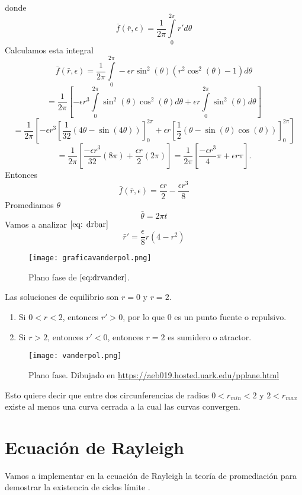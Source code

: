 donde
$$\bar{f}(\bar{r},\epsilon)=\frac{1}{2\pi}\int\limits_0^{2\pi}r'd\theta$$
Calculamos esta integral
$$\bar{f}(\bar{r},\epsilon)=\frac{1}{2\pi}\int\limits_0^{2\pi}-\epsilon r\sin^2(\theta)(r^2\cos^2(\theta)-1)d\theta$$
$$=\frac{1}{2\pi}[-\epsilon r^3\int\limits_0^{2\pi}\sin^2(\theta)\cos^2(\theta)d\theta+\epsilon r\int\limits_0^{2\pi}\sin^2(\theta)d\theta]$$
$$=\frac{1}{2\pi}[-\epsilon r^3[\frac{1}{32}(4\theta-\sin(4\theta))]_0^{2\pi}+\epsilon r[\frac{1}{2}(\theta-\sin(\theta)\cos(\theta))]_0^{2\pi}]$$
$$=\frac{1}{2\pi}[\frac{-\epsilon r^3}{32}(8\pi)+\frac{\epsilon r}{2}(2\pi)]=\frac{1}{2\pi}[\frac{-\epsilon r^3}{4}\pi+\epsilon r\pi].$$
Entonces
$$\bar{f}(\bar{r},\epsilon)=\frac{\epsilon r}{2}-\frac{\epsilon r^3}{8}$$
Promediamos $\theta$
$$\bar{\theta}=2\pi t$$
Vamos a analizar $\eqref{eq: drbar}$
\begin{equation}\label{eq: drvander}
	\bar{r}'=\frac{\epsilon}{8}r(4-r^2)
\end{equation}

\begin{figure}[h]
	\centering
	\texttt{[image: graficavanderpol.png]}
	\caption{Plano fase de $\eqref{eq:drvander}$.}
\end{figure}
Las soluciones de equilibrio son $r=0$ y $r=2$.
\begin{enumerate}
	\item Si $0<r<2$, entonces $r'>0$, por lo que $0$ es un punto fuente o repulsivo.
	\item Si $r>2$, entonces $r'<0$, entonces $r=2$ es sumidero o atractor.
\end{enumerate}

\begin{figure}[h]
	\centering
	\texttt{[image: vanderpol.png]}
	\caption{Plano fase. Dibujado en \href{https://aeb019.hosted.uark.edu/pplane.html}{https://aeb019.hosted.uark.edu/pplane.html}}
\end{figure}

Esto quiere decir que entre dos circunferencias de radios $0<r_{min}<2$ y $2<r_{max}$
existe al menos una curva cerrada a la cual las curvas convergen.

\newpage

\section{Ecuación de Rayleigh}

Vamos a implementar en la ecuación de Rayleigh la teoría de promediación para demostrar la existencia de ciclos límite \cite{strogatz2018nonlinear}.


